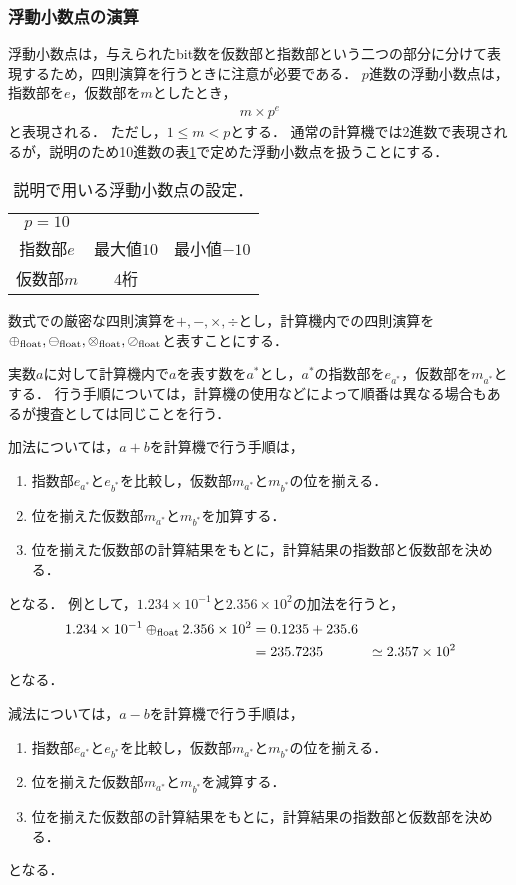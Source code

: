 \subsubsection{浮動小数点の演算}
浮動小数点は，与えられたbit数を仮数部と指数部という二つの部分に分けて表現するため，四則演算を行うときに注意が必要である．
$p$進数の浮動小数点は，指数部を$e$，仮数部を$m$としたとき，
\begin{align*}
    m \times p^e
\end{align*}
と表現される．
ただし，$1 \leq m < p$とする．
通常の計算機では2進数で表現されるが，説明のため10進数の表\ref{tab:float_setting}で定めた浮動小数点を扱うことにする．
\begin{table}[H]
    \centering
    \caption{説明で用いる浮動小数点の設定．}
    \begin{tabular}{ccc}
        \hline
        $p=10$ & & \\
        指数部$e$ & 最大値$10$ & 最小値$-10$ \\
        仮数部$m$ & 4桁 &
    \end{tabular}
    \label{tab:float_setting}
\end{table}

数式での厳密な四則演算を$+,-,\times,\div$とし，計算機内での四則演算を$\oplus_{\mathrm{float}},\ominus_{\mathrm{float}},\otimes_{\mathrm{float}},\oslash_{\mathrm{float}}$と表すことにする．

実数$a$に対して計算機内で$a$を表す数を$a^{\ast}$とし，$a^{\ast}$の指数部を$e_{a^{\ast}}$，仮数部を$m_{a^{\ast}}$とする．
行う手順については，計算機の使用などによって順番は異なる場合もあるが捜査としては同じことを行う．


加法については，$a + b$を計算機で行う手順は，
\begin{enumerate}
    \item 指数部$e_{a^{\ast}}$と$e_{b^{\ast}}$を比較し，仮数部$m_{a^{\ast}}$と$m_{b^{\ast}}$の位を揃える．
    \item 位を揃えた仮数部$m_{a^{\ast}}$と$m_{b^{\ast}}$を加算する．
    \item 位を揃えた仮数部の計算結果をもとに，計算結果の指数部と仮数部を決める．
\end{enumerate}
となる．
例として，$1.234 \times 10^{-1}$と$2.356 \times 10^{2}$の加法を行うと，
\begin{align*}
    1.234 \times 10^{-1} \oplus_{\mathrm{float}} 2.356 \times 10^{2} &= 0.1235 + 235.6 \\
    &= 235.7235 
    &\simeq 2.357 \times 10^{2}
\end{align*}
となる．

減法については，$a - b$を計算機で行う手順は，
\begin{enumerate}
    \item 指数部$e_{a^{\ast}}$と$e_{b^{\ast}}$を比較し，仮数部$m_{a^{\ast}}$と$m_{b^{\ast}}$の位を揃える．
    \item 位を揃えた仮数部$m_{a^{\ast}}$と$m_{b^{\ast}}$を減算する．
    \item 位を揃えた仮数部の計算結果をもとに，計算結果の指数部と仮数部を決める．
\end{enumerate}
となる．

